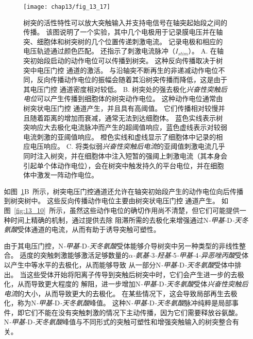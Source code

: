 \begin{figure}[htbp]
	\centering
	\texttt{[image: chap13/fig\_13\_17]}
	\caption{树突的活性特性可以放大突触输入并支持电信号在轴突起始段之间的传播。
		该图说明了一个实验，其中几个电极用于记录膜电压并在轴突、细胞体和树突树的几个位置传递刺激电流。
		记录电极和相应的电压轨迹通过颜色匹配。
		还指示了刺激电流脉冲（$I_{stim}$）\cite{stuart2016dendrites}。
		A. 在轴突初始段启动的动作电位可以传播到树突。
		这种反向传播取决于树突中电压门控  通道的激活。
		与沿轴突不断再生的非递减动作电位不同，反向传播动作电位的振幅会随着其沿树突传播而降低，这是由于其电压门控  通道密度相对较低。
		B. 树突处的强去极化\textit{兴奋性突触后电位}可以产生传播到细胞体的树突动作电位。
		这种动作电位通常由树突状电压门控  通道产生，并且具有高阈值。
		它们传播相对较慢并且随着距离的增加而衰减，通常无法到达细胞体。
		蓝色实线表示树突响应大去极化电流脉冲而产生的超阈值响应，蓝色虚线表示对较弱电流刺激的亚阈值响应。
		橙色实线和虚线显示了细胞体中记录的相应电压响应。
		C. 将类似弱\textit{兴奋性突触后电流}的亚阈值刺激电流几乎同时注入树突，并在细胞体中注入短暂的强阈上刺激电流（其本身会引起单个体动作电位），会在树突中触发持久的平台电位，并在细胞体中激发一阵动作电位\cite{larkum1999new}。}
	\label{fig:13_17}
\end{figure}


如图~\ref{fig:13_17}B~所示，树突电压门控通道还允许在轴突初始段产生的动作电位向后传播到树突树中。
这些反向传播动作电位主要由树突状电压门控  通道产生。
如图~\ref{fig:13_10}~所示，虽然这些动作电位的确切作用尚不清楚，但它们可能提供一种时间上精确的机制，通过提供去除  阻滞所需的去极化来增强通过N\textit{-甲基-}D\textit{-天冬氨酸}受体通道的电流，从而有助于诱导突触可塑性。


由于其电压门控，N\textit{-甲基-}D\textit{-天冬氨酸}受体能够介导树突中另一种类型的非线性整合。
适度的突触刺激能够激活足够数量的\textit{$\alpha$-氨基-}3\textit{-羟基-}5\textit{-甲基-}4\textit{-异恶唑丙酸}受体以产生中等水平的去极化，从而能够导致  从一部分N\textit{-甲基-}D\textit{-天冬氨酸}受体中排出。
当这些受体开始将阳离子传导到突触后树突中时，它们会产生进一步的去极化，从而导致更大程度的  解阻，进一步增加N\textit{-甲基-}D\textit{-天冬氨酸}受体\textit{兴奋性突触后电流}的大小，从而导致更大的去极化。
在某些情况下，这会导致局部再生去极化，称为N\textit{-甲基-}D\textit{-天冬氨酸}峰值。
这种N\textit{-甲基-}D\textit{-天冬氨酸}脉冲纯粹是局部事件，即它们不能在没有突触刺激的情况下主动传播，因为它们需要释放谷氨酸。
N\textit{-甲基-}D\textit{-天冬氨酸}峰值与不同形式的突触可塑性和增强突触输入的树突整合有关。


